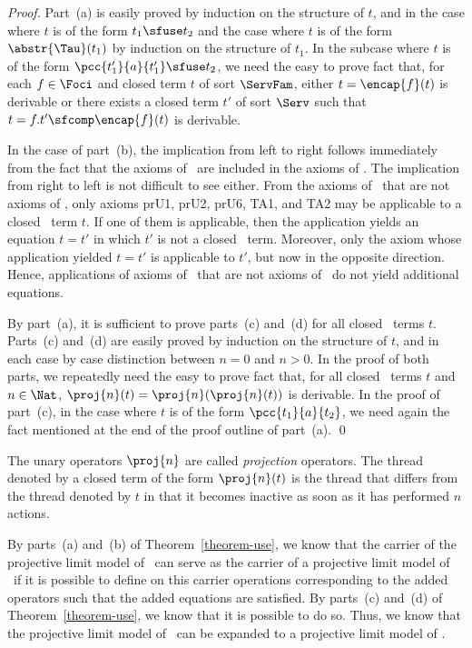 \documentclass{llncs}
\begin{document}
\begin{proof}
Part~(a) is easily proved by induction on the structure of $t$, and in 
the case where $t$ is of the form $t_1 \sfuse t_2$ and the case where 
$t$ is of the form $\abstr{\Tau}(t_1)$ by induction on the structure of 
$t_1$.
In the subcase where $t$ is of the form 
\mbox{$\pcc{t'_1}{a}{t'_1} \sfuse t_2$}, we need the easy to prove fact 
that, for each $f \in \Foci$ and closed term $t$ of sort $\ServFam$, 
either $t = \encap{f}(t)$ is derivable or there exists a closed term 
$t'$ of sort $\Serv$ such that $t = f.t' \sfcomp \encap{f}(t)$ is 
derivable.

In the case of part~(b), the implication from left to right follows 
immediately from the fact that the axioms of \prBTA\ are included in the 
axioms of \prTSI.
The implication from right to left is not difficult to see either. 
From the axioms of \prTSI\ that are not axioms of \prBTA, only axioms 
prU1, prU2, prU6, TA1, and TA2 may be applicable to a closed \prBTA\ 
term $t$.
If one of them is applicable, then the application yields an equation 
$t = t'$ in which $t'$ is not a closed \prBTA\ term.
Moreover, only the axiom whose application yielded $t = t'$ is 
applicable to $t'$, but now in the opposite direction.
Hence, applications of axioms of \prTSI\ that are not axioms of \prBTA\
do not yield additional equations.

By part~(a), it is sufficient to prove parts~(c) and~(d) for all closed 
\prBTA\ terms $t$.
Parts~(c) and~(d) are easily proved by induction on the structure of 
$t$, and in each case by case distinction between $n = 0$ and 
$n > 0$.
In the proof of both parts, we repeatedly need the easy to prove fact 
that, for all closed \prBTA\ terms $t$ and $n \in \Nat$, 
$\proj{n}(t) = \proj{n}(\proj{n}(t))$ is derivable.
In the proof of part~(c), in the case where $t$ is of the form 
$\pcc{t_1}{a}{t_2}$, we need again the fact mentioned at the end of the
proof outline of part~(a).
\qed
\end{proof}
The unary operators $\proj{n}$ are called \emph{projection} operators.
The thread denoted by a closed term of the form $\proj{n}(t)$ is the 
thread that differs from the thread denoted by $t$ in that it becomes 
inactive as soon as it has performed $n$ actions.

By parts~(a) and~(b) of Theorem~\ref{theorem-use}, we know that the 
carrier of the projective limit model of \prBTA\ can serve as the 
carrier of a projective limit model of \prTSI\ if it is possible to 
define on this carrier operations corresponding to the added operators 
such that the added equations are  satisfied.
By  parts~(c) and~(d) of Theorem~\ref{theorem-use}, we know that it is 
possible to do so.
Thus, we know that the projective limit model of \prBTA\ can be expanded 
to a projective limit model of \prTSI.
\end{document}
